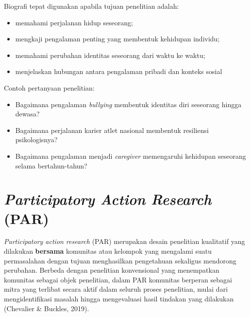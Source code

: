 \documentclass[
  indonesian,
  letterpaper,
  DIV=11,
  numbers=noendperiod]{scrreprt}
\providecommand{\tightlist}{%
  \setlength{\itemsep}{0pt}\setlength{\parskip}{0pt}}
\begin{document}
\begin{tcolorbox}[enhanced jigsaw, colframe=quarto-callout-tip-color-frame, toptitle=1mm, breakable, leftrule=.75mm, arc=.35mm, toprule=.15mm, colback=white, colbacktitle=quarto-callout-tip-color!10!white, bottomtitle=1mm, bottomrule=.15mm, titlerule=0mm, title={Kapan menggunakan biografi?}, coltitle=black, left=2mm, opacitybacktitle=0.6, opacityback=0, rightrule=.15mm]

Biografi tepat digunakan apabila tujuan penelitian adalah:

\begin{itemize}
\tightlist
\item
  memahami perjalanan hidup seseorang;
\item
  mengkaji pengalaman penting yang membentuk kehidupan individu;
\item
  memahami perubahan identitas seseorang dari waktu ke waktu;
\item
  menjelaskan hubungan antara pengalaman pribadi dan konteks sosial
\end{itemize}

Contoh pertanyaan penelitian:

\begin{itemize}
\tightlist
\item
  Bagaimana pengalaman \emph{bullying} membentuk identitas diri
  seseorang hingga dewasa?
\item
  Bagaimana perjalanan karier atlet nasional membentuk resiliensi
  psikologisnya?
\item
  Bagaimana pengalaman menjadi \emph{caregiver} memengaruhi kehidupan
  seseorang selama bertahun-tahun?
\end{itemize}

\end{tcolorbox}

\section{\texorpdfstring{\emph{Participatory Action Research}
(PAR)}{Participatory Action Research (PAR)}}\label{participatory-action-research-par}

\emph{Participatory action research} (PAR) merupakan desain penelitian
kualitatif yang dilakukan \textbf{bersama} komunitas atau kelompok yang
mengalami suatu permasalahan dengan tujuan menghasilkan pengetahuan
sekaligus mendorong perubahan. Berbeda dengan penelitian konvensional
yang menempatkan komunitas sebagai objek penelitian, dalam PAR komunitas
berperan sebagai mitra yang terlibat secara aktif dalam seluruh proses
penelitian, mulai dari mengidentifikasi masalah hingga mengevaluasi
hasil tindakan yang dilakukan (Chevalier \& Buckles, 2019).
\end{document}
